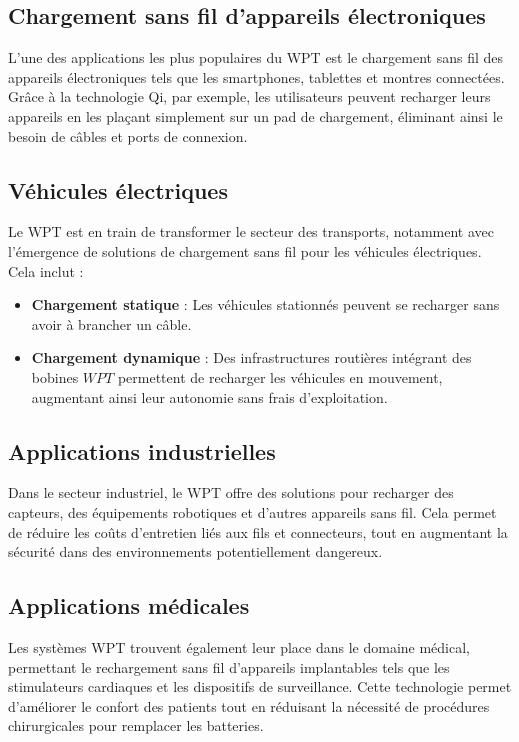 \documentclass[12pt,a4paper,titlepage,notitlepage]{article}
\begin{document}
	\subsection{Chargement sans fil d'appareils électroniques}
	
	L'une des applications les plus populaires du WPT est le chargement sans fil des appareils électroniques tels que les smartphones, tablettes et montres connectées. Grâce à la technologie Qi, par exemple, les utilisateurs peuvent recharger leurs appareils en les plaçant simplement sur un pad de chargement, éliminant ainsi le besoin de câbles et ports de connexion.
	
	\subsection{Véhicules électriques}
	
	Le WPT est en train de transformer le secteur des transports, notamment avec l'émergence de solutions de chargement sans fil pour les véhicules électriques. Cela inclut :
	\begin{itemize}
		\item \textbf{Chargement statique} : Les véhicules stationnés peuvent se recharger sans avoir à brancher un câble.
		\item \textbf{Chargement dynamique} : Des infrastructures routières intégrant des bobines $WPT$ permettent de recharger les véhicules en mouvement, augmentant ainsi leur autonomie sans frais d'exploitation.
	\end{itemize}
	
	\subsection{Applications industrielles}
	
	Dans le secteur industriel, le WPT offre des solutions pour recharger des capteurs, des équipements robotiques et d'autres appareils sans fil. Cela permet de réduire les coûts d'entretien liés aux fils et connecteurs, tout en augmentant la sécurité dans des environnements potentiellement dangereux.
	
	\subsection{Applications médicales}
	
	Les systèmes WPT trouvent également leur place dans le domaine médical, permettant le rechargement sans fil d'appareils implantables tels que les stimulateurs cardiaques et les dispositifs de surveillance. Cette technologie permet d'améliorer le confort des patients tout en réduisant la nécessité de procédures chirurgicales pour remplacer les batteries.
	
\end{document}
